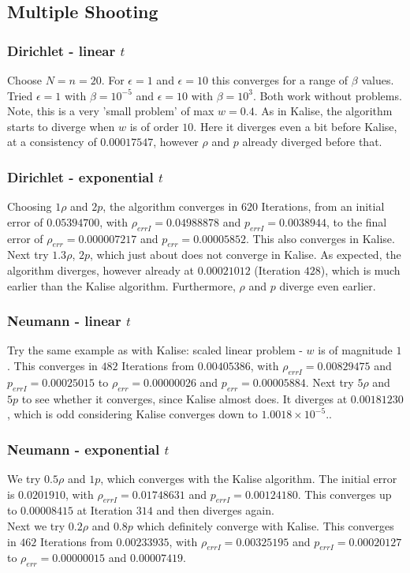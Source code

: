 \documentclass[11pt, a4paper]{article}
\theoremstyle{definition}
\begin{document}
\subsection{Multiple Shooting}

\subsubsection{Dirichlet - linear $t$}
Choose $N=n=20$.
For $\epsilon = 1$ and $\epsilon =10$ this converges for a range of $\beta$ values. Tried $\epsilon =1$ with $\beta = 10^{-5}$ and $\epsilon=10$ with $\beta =10^3$. Both work without problems. Note, this is a very 'small problem' of max $w = 0.4$.
As in Kalise, the algorithm starts to diverge when $w$ is of order $10$. Here it diverges even a bit before Kalise, at a consistency of $0.00017547$, however $\rho$ and $p$ already diverged before that.
\subsubsection{Dirichlet - exponential $t$}
Choosing $1\rho$ and $2p$, the algorithm converges in $620$ Iterations, from an initial error of $0.05394700$, with $\rho_{errI}= 0.04988878$ and $p_{errI} = 0.0038944$, to the final error of $\rho_{err} = 0.000007217$ and $p_{err} = 0.00005852$. This also converges in Kalise.\\
Next try $1.3 \rho$, $2p$, which just about does not converge in Kalise. As expected, the algorithm diverges, however already at $0.00021012$ (Iteration $428$), which is much earlier than the Kalise algorithm. Furthermore, $\rho$ and $p$ diverge even earlier.

\subsubsection{Neumann - linear $t$}
Try the same example as with Kalise: scaled linear problem - $w$ is of magnitude $1$.
This converges in $482$ Iterations from $0.00405386$, with $\rho_{errI}= 0.00829475$ and $p_{errI}=0.00025015$ to $\rho_{err} = 0.00000026$ and $p_{err}=0.00005884$.
Next try $5 \rho$ and $5p$ to see whether it converges, since Kalise almost does. It diverges at $0.00181230$, which is odd considering Kalise converges down to $1.0018 \times 10^{-5}$..
\subsubsection{Neumann - exponential $t$}
We try $0.5 \rho$ and $1p$, which converges with the Kalise algorithm. The initial error is $0.0201910$, with $\rho_{errI} = 0.01748631$ and $p_{errI}= 0.00124180$. This converges up to $0.00008415$ at Iteration $314$ and then diverges again.\\
Next we try $0.2 \rho$ and $0.8 p$ which definitely converge with Kalise. This converges in $462$ Iterations from $0.00233935$, with $\rho_{errI} = 0.00325195$ and $p_{errI} = 0.00020127$ to $\rho_{err} = 0.00000015$ and $0.00007419$.
\end{document}
